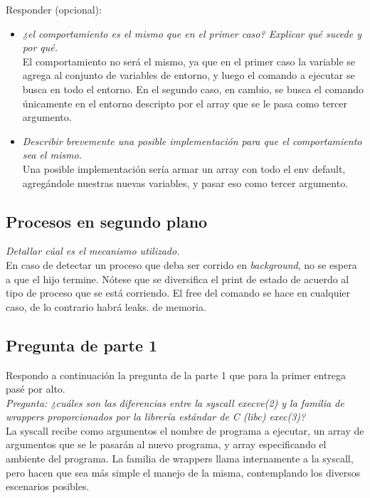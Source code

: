 \documentclass{article}
\begin{document}
Responder (opcional):
\begin{itemize}

    \item \textit{¿el comportamiento es el mismo que en el primer caso? Explicar qué sucede y por qué.}\\
        El comportamiento no será el mismo, ya que en el primer caso la variable se agrega al conjunto de variables de entorno, y luego el comando a ejecutar se busca en todo el entorno. En el segundo caso, en cambio, se busca el comando únicamente en el entorno descripto por el array que se le pasa como tercer argumento.
    \item \textit{Describir brevemente una posible implementación para que el comportamiento sea el mismo.}\\
        Una posible implementación sería armar un array con todo el env default, agregándole nuestras nuevas variables, y pasar eso como tercer argumento.
\end{itemize}

\subsection{Procesos en segundo plano}
\textit{Detallar cúal es el mecanismo utilizado.}\\
En caso de detectar un proceso que deba ser corrido en \textit{background}, no se espera a que el hijo termine. Nótese que se diversifica el print de estado de acuerdo al tipo de proceso que se está corriendo. El free del comando se hace en cualquier caso, de lo contrario habrá leaks. de memoria. 


\subsection{Pregunta de parte 1}
Respondo a continuación la pregunta de la parte 1 que para la primer entrega pasé por alto.\\

\textit{Pregunta: ¿cuáles son las diferencias entre la syscall execve(2) y la familia de wrappers proporcionados por la librería estándar de C (libc) exec(3)?}\\
La syscall recibe como argumentos el nombre de programa a ejecutar, un array de argumentos que se le pasarán al nuevo programa, y array especificando el ambiente del programa. La familia de wrappers llama internamente a la syscall, pero hacen que sea más simple el manejo de la misma, contemplando los diversos escenarios posibles.
\end{document}
